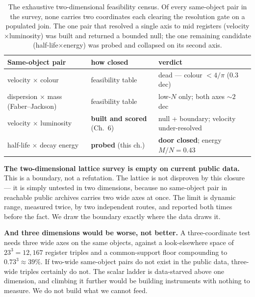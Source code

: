 \documentclass[11pt, letterpaper, openany]{book}
\begin{document}
\begin{table}[H]
\centering
\small
\begin{tabular}{@{}lll@{}}
\toprule
\textbf{Same-object pair} & \textbf{how closed} & \textbf{verdict} \\
\midrule
velocity $\times$ colour & feasibility table & dead --- colour $< 4/\pi$ ($0.3$ dec) \\
dispersion $\times$ mass (Faber--Jackson) & feasibility table & low-$N$ only; both axes $\sim 2$ dec \\
velocity $\times$ luminosity & \textbf{built and scored} (Ch.~6) & null + boundary; velocity under-resolved \\
half-life $\times$ decay energy & \textbf{probed} (this ch.) & \textbf{door closed}; energy $M/N = 0.43$ \\
\bottomrule
\end{tabular}
\caption{The exhaustive two-dimensional feasibility census. Of every same-object pair in the
survey, none carries two coordinates each clearing the resolution gate on a populated join. The one
pair that resolved a single axis to mid registers (velocity$\times$luminosity) was built and
returned a bounded null; the one remaining candidate (half-life$\times$energy) was probed and
collapsed on its second axis.}
\end{table}

\begin{nullbox}
\textbf{The two-dimensional lattice survey is empty on current public data.} This is a boundary, not
a refutation. The lattice is not disproven by this closure --- it is simply untested in two
dimensions, because no same-object pair in reachable public archives carries two wide axes at once.
The limit is dynamic range, measured twice, by two independent routes, and reported both times before
the fact. We draw the boundary exactly where the data draws it.
\end{nullbox}

\begin{warningbox}
\textbf{And three dimensions would be worse, not better.} A three-coordinate test needs three wide
axes on the same objects, against a look-elsewhere space of $23^3 = 12{,}167$ register triples and a
common-support floor compounding to $0.73^3 \approx 39\%$. If two-wide same-object pairs do not exist
in the public data, three-wide triples certainly do not. The scalar ladder is data-starved above one
dimension, and climbing it further would be building instruments with nothing to measure. We do not
build what we cannot feed.
\end{warningbox}
\end{document}
